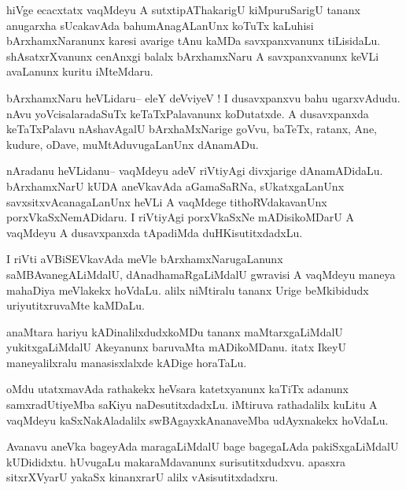 \documentclass{article}
\begin{document}
\begin{mn}%
hiVge ecacxtatx vaqMdeyu A sutxtipAThakarigU kiMpuruSarigU tananx anugarxha sUcakavAda 
bahumAnagALanUnx koTuTx kaLuhisi bArxhamxNaranunx karesi avarige tAnu kaMDa savxpanxvanunx 
tiLisidaLu. shAsatxrXvanunx cenAnxgi balalx bArxhamxNaru A savxpanxvanunx keVLi avaLanunx 
kuritu iMteMdaru.
\end{mn}

\begin{mn}%
bArxhamxNaru heVLidaru-- eleY deVviyeV ! I dusavxpanxvu bahu ugarxvAdudu. nAvu 
yoVcisalaradaSuTx keTaTxPalavanunx koDutatxde. A dusavxpanxda keTaTxPalavu nAshavAgalU 
bArxhaMxNarige goVvu, baTeTx, ratanx, Ane, kudure, oDave, muMtAduvugaLanUnx dAnamADu.
\end{mn}

\begin{mn}%
nAradanu heVLidanu-- vaqMdeyu adeV riVtiyAgi divxjarige dAnamADidaLu. bArxhamxNarU kUDA 
aneVkavAda aGamaSaRNa, sUkatxgaLanUnx savxsitxvAcanagaLanUnx heVLi A vaqMdege 
tithoRVdakavanUnx porxVkaSxNemADidaru. I riVtiyAgi porxVkaSxNe mADisikoMDarU A vaqMdeyu A 
dusavxpanxda tApadiMda duHKisutitxdadxLu.
\end{mn}

\begin{mn}%
I riVti aVBiSEVkavAda meVle bArxhamxNarugaLanunx saMBAvanegALiMdalU, dAnadhamaRgaLiMdalU 
gwravisi A vaqMdeyu maneya mahaDiya meVlakekx hoVdaLu. alilx niMtiralu tananx Urige 
beMkibidudx uriyutitxruvaMte kaMDaLu.
\end{mn}

\begin{mn}%
anaMtara hariyu kADinalilxdudxkoMDu tananx maMtarxgaLiMdalU yukitxgaLiMdalU Akeyanunx 
baruvaMta mADikoMDanu. itatx IkeyU maneyalilxralu manasisxlalxde kADige horaTaLu. 
\end{mn}

\begin{mn}%
oMdu utatxmavAda rathakekx heVsara katetxyanunx kaTiTx adanunx samxradUtiyeMba saKiyu 
naDesutitxdadxLu.  iMtiruva rathadalilx kuLitu A vaqMdeyu kaSxNakAladalilx 
swBAgayxkAnanaveMba udAyxnakekx hoVdaLu.
\end{mn}

\begin{mn}%
Avanavu aneVka bageyAda maragaLiMdalU bage bagegaLAda pakiSxgaLiMdalU kUDididxtu. hUvugaLu 
makaraMdavanunx surisutitxdudxvu. apasxra sitxrXVyarU yakaSx kinanxrarU alilx 
vAsisutitxdadxru.
\end{mn}
\end{document}
